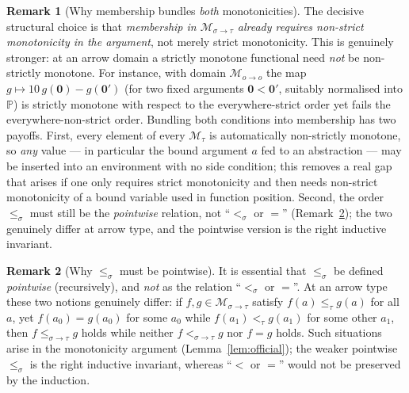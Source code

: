 \documentclass{amsart}
\theoremstyle{definition}
\newtheorem{remark}{Remark}
\begin{document}
\begin{remark}[Why membership bundles \emph{both} monotonicities]\label{rem:bundle}
The decisive structural choice is that \emph{membership in $\mathcal M_{\sigma\to\tau}$
already requires non-strict monotonicity in the argument}, not merely strict
monotonicity. This is genuinely stronger: at an arrow domain a strictly monotone
functional need \emph{not} be non-strictly monotone. For instance, with domain
$\mathcal M_{o\to o}$ the map $g\mapsto 10\,g(\mathbf 0)-g(\mathbf 0')$ (for two fixed
arguments $\mathbf 0<\mathbf 0'$, suitably normalised into $\mathbb P$) is strictly
monotone with respect to the everywhere-strict order yet fails the everywhere-non-strict
order. Bundling both conditions into membership has two payoffs. First, every element of
every $\mathcal M_\tau$ is automatically non-strictly monotone, so \emph{any} value --- in
particular the bound argument $a$ fed to an abstraction --- may be inserted into an
environment with no side condition; this removes a real gap that arises if one only
requires strict monotonicity and then needs non-strict monotonicity of a bound variable
used in function position. Second, the order $\le_\sigma$ must still be the
\emph{pointwise} relation, not ``$<_\sigma$ or $=$'' (Remark~\ref{rem:leq}); the two
genuinely differ at arrow type, and the pointwise version is the right inductive
invariant.
\end{remark}

\begin{remark}[Why $\le_\sigma$ must be pointwise]\label{rem:leq}
It is essential that $\le_\sigma$ be defined \emph{pointwise} (recursively), and
\emph{not} as the relation ``$<_\sigma$ or $=$''. At an arrow type these two notions
genuinely differ: if $f,g\in\mathcal M_{\sigma\to\tau}$ satisfy $f(a)\le_\tau g(a)$ for
all $a$, yet $f(a_0)=g(a_0)$ for some $a_0$ while $f(a_1)<_\tau g(a_1)$ for some other
$a_1$, then $f\le_{\sigma\to\tau}g$ holds while neither $f<_{\sigma\to\tau}g$ nor $f=g$
holds. Such situations arise in the monotonicity argument (Lemma~\ref{lem:official}); the
weaker pointwise $\le_\sigma$ is the right inductive invariant, whereas ``$<$ or $=$''
would not be preserved by the induction.
\end{remark}
\end{document}
